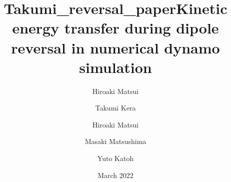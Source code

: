 \documentclass[review]{elsarticle}
\title{Takumi\_reversal\_paper}
\author{Hiroaki Matsui}
\date{March 2022}
\begin{document}
\title{Kinetic energy transfer during dipole reversal in numerical dynamo simulation}

\author[Tohoku]{Takumi Kera}
\author[ucd]{Hiroaki Matsui}
\author[TITECH]{Masaki Matsushima}
\author[Tohoku]{Yuto Katoh }

\address[Tohoku]{Department of Geophysics, Tohoku University, Sendai, Japan.}
\address[ucd]{Department of the Earth and Planetary Sciences, University of California, Davis, CA, USA.}
\address[TITECH]{Department of Earth and Planetary Sciences, Tokyo Institute of Technology, Tokyo, Japan.}


\maketitle











%
\end{document}
